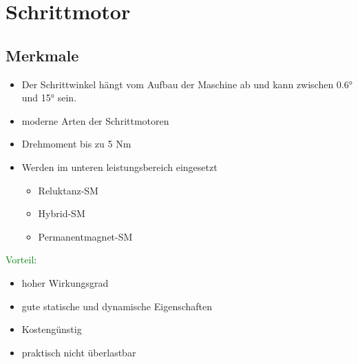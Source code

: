 \section{Schrittmotor}
    \subsection{Merkmale}
        \begin{itemize}
            \item Der Schrittwinkel hängt vom Aufbau der Maschine ab und kann zwischen 0.6° und 15° sein.
            \item moderne Arten der Schrittmotoren
            \item Drehmoment bis zu 5 Nm
            \item Werden im unteren leistungsbereich eingesetzt
            \begin{itemize}
                \item Reluktanz-SM
                \item Hybrid-SM
                \item Permanentmagnet-SM
            \end{itemize}
        \end{itemize}
        \textcolor{green}{Vorteil}:
        \begin{itemize}
            \item hoher Wirkungsgrad
            \item gute statische und dynamische Eigenschaften
            \item Kostengünstig
            \item praktisch nicht überlastbar
        \end{itemize}
    

